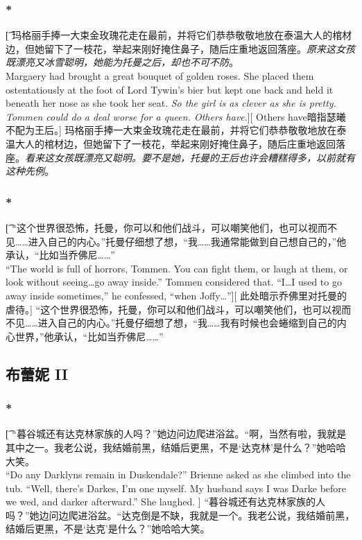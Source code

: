 \documentclass[12pt,a4paper]{article}
\begin{document}
\subsubsection{\color{red}*}\t[
	玛格丽手捧一大束金玫瑰花走在最前，并将它们恭恭敬敬地放在泰温大人的棺材边，但她留下了一枝花，举起来刚好掩住鼻子，随后庄重地返回落座。\emph{原来这女孩既漂亮又冰雪聪明，她能为托曼之后，却也不可不防}。\\
	Margaery had brought a great bouquet of golden roses. She placed them ostentatiously at the foot of Lord Tywin's bier but kept one back and held it beneath her nose as she took her seat. \emph{So the girl is as clever as she is pretty. Tommen could do a deal worse for a queen. Others have}.][
	Others have暗指瑟曦不配为王后。]
	玛格丽手捧一大束金玫瑰花走在最前，并将它们恭恭敬敬地放在泰温大人的棺材边，但她留下了一枝花，举起来刚好掩住鼻子，随后庄重地返回落座。\emph{看来这女孩既漂亮又聪明。要不是她，托曼的王后也许会糟糕得多，以前就有这种先例}。

\subsubsection{\color{red}*}\t[
	“这个世界很恐怖，托曼，你可以和他们战斗，可以嘲笑他们，也可以视而不见……进入自己的内心。”托曼仔细想了想，“我……我通常能做到自己想自己的，”他承认，“比如当乔佛尼……”\\
	“The world is full of horrors, Tommen. You can fight them, or laugh at them, or look without seeing\ldots go away inside.” Tommen considered that. “I\ldots I used to go away inside sometimes,” he confessed, “when Joffy\ldots”][
	此处暗示乔佛里对托曼的虐待。]
	“这个世界很恐怖，托曼，你可以和他们战斗，可以嘲笑他们，也可以视而不见……进入自己的内心。”托曼仔细想了想，“我……我有时候也会蜷缩到自己的内心世界，”他承认，“比如当乔佛尼……” 
		
\subsection{布蕾妮 II}
\subsubsection{\color{red}*}\t[
	“暮谷城还有达克林家族的人吗？”她边问边爬进浴盆。“啊，当然有啦，我就是其中之一。我老公说，我结婚前黑，结婚后更黑，不是‘达克林’是什么？”她哈哈大笑。\\
	“Do any Darklyns remain in Duskendale?” Brienne asked as she climbed into the tub. “Well, there's Darkes, I'm one myself. My husband says I was Darke before we wed, and darker afterward.” She laughed. ]
	“暮谷城还有达克林家族的人吗？”她边问边爬进浴盆。“达克倒是不缺，我就是一个。我老公说，我结婚前黑，结婚后更黑，不是‘达克’是什么？”她哈哈大笑。
	
\end{document}

